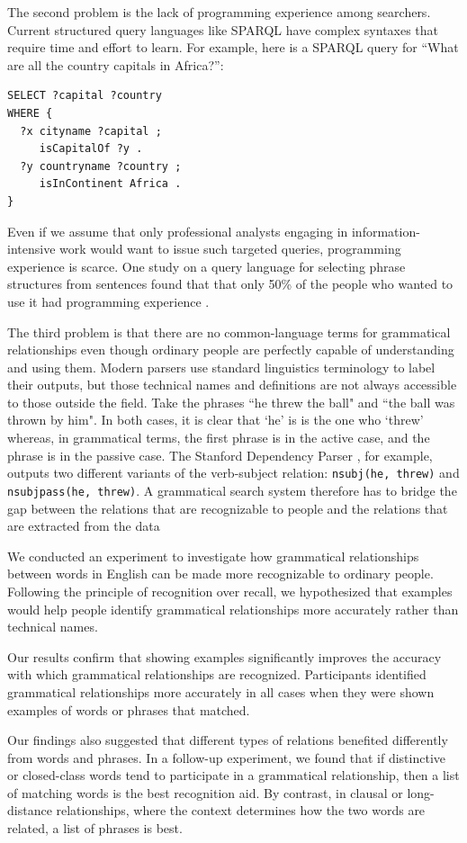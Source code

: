 \documentclass{sigchi}
\newcommand{\code}[1] {\texttt{#1}}
\begin{document}
The second problem is the lack of programming experience among searchers. Current structured query languages like SPARQL have complex syntaxes that require time and effort to learn. For example, here is a SPARQL query for ``What are all the country capitals in Africa?'':
\begin{verbatim}
SELECT ?capital ?country
WHERE {
  ?x cityname ?capital ;
     isCapitalOf ?y .
  ?y countryname ?country ;
     isInContinent Africa .
}
\end{verbatim}
Even if we assume that only professional analysts engaging in information-intensive work would want to issue such targeted queries,  programming experience is scarce. One study on a query language for selecting phrase structures from sentences found that that only 50\% of the people who wanted to use it had programming experience \cite{}.

The third problem is that there are no common-language terms for grammatical relationships even though ordinary people are perfectly capable of understanding and using them. Modern parsers use standard linguistics terminology to label their outputs, but those technical names and definitions are not always accessible to those outside the field. Take the phrases ``he threw the ball" and ``the ball was thrown by him". In both cases, it is clear that `he' is is the one who `threw' whereas, in grammatical terms, the first phrase is in the active case, and the phrase is in the passive case. The Stanford Dependency Parser \cite{}, for example, outputs two different variants of the verb-subject relation: \code{nsubj(he, threw)} and \code{nsubjpass(he, threw)}. A grammatical search system therefore has to bridge the gap between the relations that are recognizable to people and the relations that are extracted from the data

We conducted an experiment to investigate how grammatical relationships between words in English can be made more recognizable to ordinary people. Following the principle of recognition over recall, we hypothesized that examples would help people identify grammatical relationships more accurately rather than technical names.

Our results confirm that showing examples significantly improves the accuracy with which grammatical relationships are recognized. Participants identified grammatical relationships more accurately in all cases when they were  shown examples of words or phrases that matched.

Our findings also suggested that different types of relations benefited differently from words and phrases. In a follow-up experiment, we found that if distinctive or closed-class words tend to participate in a grammatical relationship, then a list of matching words is the best recognition aid. By contrast, in clausal or long-distance relationships, where the context determines how the two words are related, a list of phrases is best.
\end{document}
